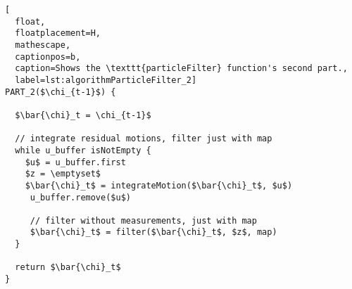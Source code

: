 \begin{lstlisting}[
  float,
  floatplacement=H,
  mathescape,
  captionpos=b,
  caption=Shows the \texttt{particleFilter} function's second part.,
  label=lst:algorithmParticleFilter_2]
PART_2($\chi_{t-1}$) {

  $\bar{\chi}_t = \chi_{t-1}$

  // integrate residual motions, filter just with map
  while u_buffer isNotEmpty {
    $u$ = u_buffer.first
    $z = \emptyset$
    $\bar{\chi}_t$ = integrateMotion($\bar{\chi}_t$, $u$)
     u_buffer.remove($u$)

     // filter without measurements, just with map
     $\bar{\chi}_t$ = filter($\bar{\chi}_t$, $z$, map)
  }

  return $\bar{\chi}_t$
}
\end{lstlisting}
